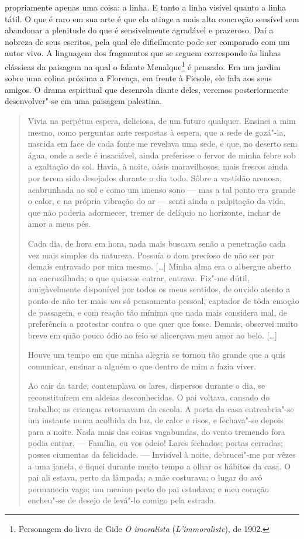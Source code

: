 propriamente apenas uma coisa: a linha. E tanto a linha visível
quanto a linha tátil. O que é raro em sua arte é que ela atinge
a mais alta concreção sensível sem abandonar a plenitude do que é
sensivelmente agradável e prazeroso. Daí a nobreza de seus escritos, pela
qual ele dificilmente pode ser comparado com um autor vivo. A
linguagem dos fragmentos que se seguem corresponde às linhas clássicas
da paisagem na qual o falante Menalque\footnote{Personagem do
  livro de Gide \emph{O imoralista} (\emph{L'immoraliste}), de 1902. \versal{[N.~T.]}} é
pensado. Em um jardim sobre uma colina próxima a Florença, em frente à
Fiesole, ele fala aos seus amigos. O drama espiritual que desenrola
diante deles, veremos posteriormente desenvolver"-se em uma paisagem
palestina.

\begin{quote}
Vivia na perpétua espera, deliciosa, de um futuro qualquer. Ensinei a
mim mesmo, como perguntas ante respostas à espera, que a sede de
gozá"-la, nascida em face de cada fonte me revelava uma sede, e que, no
deserto sem água, onde a sede é insaciável, ainda preferisse o fervor de
minha febre sob a exaltação do sol. Havia, à noite, oásis maravilhosos,
mais frescos ainda por terem sido desejados durante o dia todo. Sôbre a
vastidão arenosa, acabrunhada ao sol e como um imenso sono --- mas a tal
ponto era grande o calor, e na própria vibração do ar --- senti ainda a
palpitação da vida, que não poderia adormecer, tremer de delíquio no
horizonte, inchar de amor a meus pés.

Cada dia, de hora em hora, nada mais buscava senão a penetração cada vez
mais simples da natureza. Possuía o dom precioso de não ser por demais
entravado por mim mesmo. {[}\ldots{}{]} Minha alma era o albergue aberto na
encruzilhada; o que quisesse entrar, entrava. Fiz"-me dútil,
amigàvelmente disponível por todos os meus sentidos, de ouvido atento a
ponto de não ter mais \emph{um} só pensamento pessoal, captador de tôda
emoção de passagem, e com reação tão mínima que nada mais considera mal,
de preferência a protestar contra o que quer que fosse. Demais, observei
muito breve em quão pouco ódio ao feio se alicerçava meu amor ao belo.
{[}\ldots{}{]}

Houve um tempo em que minha alegria se tornou tão grande que a quis
comunicar, ensinar a alguém o que dentro de mim a fazia viver.

Ao cair da tarde, contemplava os lares, dispersos durante o dia, se
reconstituírem em aldeias desconhecidas. O pai voltava, cansado do
trabalho; as crianças retornavam da escola. A porta da casa
entreabria"-se um instante numa acolhida da luz, de calor e risos, e
fechava"-se depois para a noite. Nada mais das coisas vagabundas, do
vento tremendo fora podia entrar. --- Família, eu vos odeio! Lares
fechados; portas cerradas; posses ciumentas da felicidade. --- Invisível
à noite, debrucei"-me por vêzes a uma janela, e fiquei durante muito
tempo a olhar os hábitos da casa. O pai ali estava, perto da lâmpada; a
mãe costurava; o lugar do avô permanecia vago; um menino perto do pai
estudava; e meu coração encheu"-se de desejo de levá"-lo comigo pela
estrada.


\end{quote}
